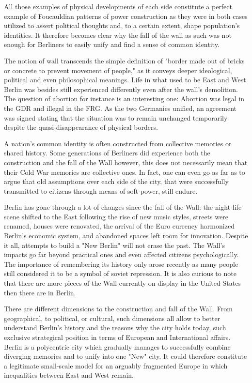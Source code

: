    All those examples of physical developments of each side constitute a
   perfect example of Foucauldian patterns of power construction as they
   were in both cases utilized to assert political thoughts and, to a
   certain extent, shape population's identities. It therefore becomes
   clear why the fall of the wall as such was not enough for Berliners to
   easily unify and find a sense of common identity.

   The notion of wall transcends the simple definition of "border made out
   of bricks or concrete to prevent movement of people," as it conveys
   deeper ideological, political and even philosophical meanings. Life in
   what used to be East and West Berlin was besides still experienced
   differently even after the wall's demolition. The question of abortion
   for instance is an interesting one: Abortion was legal in the GDR and
   illegal in the FRG. As the two Germanies unified, an agreement was
   signed stating that the situation was to remain unchanged temporarily
   despite the quasi-disappearance of physical borders.

   A nation's common identity is often constructed from collective
   memories or shared history. Some generations of Berliners did
   experience both the construction and the fall of the Wall however, this
   does not necessarily mean that their Cold War memories are collective
   ones. In fact, one can even go as far as to argue that old assumptions
   over each side of the city, that were successfully transmitted to
   citizens through means of soft power, still endure.

   Berlin has gone through a lot of changes since the fall of the Wall:
   the night-life scene shifted to the East following the rise of new
   music styles, streets were renamed, houses were renovated, the arrival
   of the Euro currency harmonized Berlin's economic system, and abandoned
   spaces left room for innovation. Despite it all, attempts to build a
   "New Berlin" will not erase the past. The Wall's impacts go far beyond
   practical ones and even affected citizens psychologically. The
   importance of remembering its history only arose recently as many
   people still considered it to be a symbol of soviet repression. It is
   also curious to note that there are more pieces of the Wall currently
   on display in the United States then there are in Berlin.

   There are different dimensions to the construction and fall of the
   Wall. From geographical, to political, or cultural, such dimensions all
   allow to better understand Berlin's history and the reasons why the
   city holds today, such exclusive strategical position in terms of
   European and International affairs. Berlin is a polycentric city which
   gradually manages to successfully combine diverging memories and to
   unify into one "New" city. It could therefore constitute a legitimate
   small-scale model for an arguably fragmented Europe in which
   inequalities between East and West remain.

